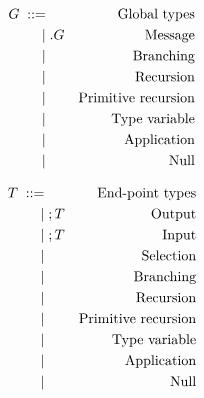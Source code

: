 \documentclass{article}
\begin{document}
\begin{align*}
  G \grmeq & & \text{Global types}\\
  \grmor & \gsendType p{p'}UG    & \text{Message}\\
  \grmor & \gbranchType p{p'}lG  & \text{Branching}\\
  \grmor & \grecurType xG        & \text{Recursion}\\
  \grmor & \gprimrecType GiIx{G'}& \text{Primitive recursion}\\
  \grmor & \grecvarType x        & \text{Type variable}\\
  \grmor & \gappType Gi          & \text{Application}\\
  \grmor & \gendType             & \text{Null}\\
\end{align*}

\begin{align*}
  T \grmeq & & \text{End-point types}\\
  \grmor & \sendType UT          & \text{Output}\\
  \grmor & \recvType UT          & \text{Input}\\
  \grmor & \selectType lT        & \text{Selection}\\
  \grmor & \branchType lt        & \text{Branching}\\
  \grmor & \recurType xT         & \text{Recursion}\\
  \grmor & \primrecType TiIx{T'} & \text{Primitive recursion}\\
  \grmor & \recvarType x         & \text{Type variable}\\
  \grmor & \appType Ti           & \text{Application}\\
  \grmor & \EndType              & \text{Null}\\
\end{align*}
\end{document}
